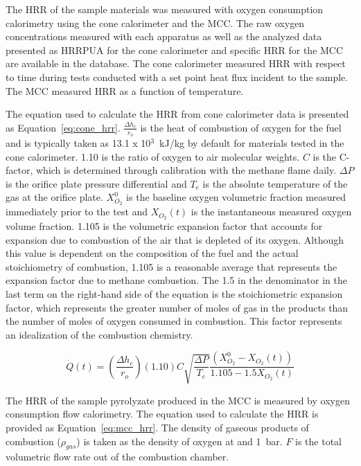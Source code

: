 \documentclass[12pt,oneside]{book}
\begin{document}
The HRR of the sample materials was measured with oxygen consumption calorimetry using the cone calorimeter and the MCC. The raw oxygen concentrations measured with each apparatus as well as the analyzed data presented as HRRPUA for the cone calorimeter and specific HRR for the MCC are available in the database. The cone calorimeter measured HRR with respect to time during tests conducted with a set point heat flux incident to the sample. The MCC measured HRR as a function of temperature.

The equation used to calculate the HRR from cone calorimeter data is presented as Equation~\ref{eq:cone_hrr}. $\frac{\Delta{h_c}}{r_o}$ is the heat of combustion of oxygen for the fuel and is typically taken as 13.1 x 10$^3$~kJ/kg by default for materials tested in the cone calorimeter. 1.10 is the ratio of oxygen to air molecular weights. $C$ is the C-factor, which is determined through calibration with the methane flame daily. $\Delta{P}$ is the orifice plate pressure differential and $T_e$ is the absolute temperature of the gas at the orifice plate. $X_{O_2}^0$ is the baseline oxygen volumetric fraction measured immediately prior to the test and $X_{O_2}(t)$ is the instantaneous measured oxygen volume fraction. 1.105 is the volumetric expansion factor that accounts for expansion due to combustion of the air that is depleted of its oxygen. Although this value is dependent on the composition of the fuel and the actual stoichiometry of combustion, 1.105 is a reasonable average that represents the expansion factor due to methane combustion. The 1.5 in the denominator in the last term on the right-hand side of the equation is the stoichiometric expansion factor, which represents the greater number of moles of gas in the products than the number of moles of oxygen consumed in combustion. This factor represents an idealization of the combustion chemistry.

\begin{equation}
\dot{Q}(t) = \left(\frac{\Delta{h_c}}{r_o}\right)(1.10)C\sqrt{\frac{\Delta{P}}{T_e}}\frac{(X_{O_2}^0-X_{O_2}(t))}{1.105-1.5X_{O_2}(t)}  \label{eq:cone_hrr}
\end{equation}

The HRR of the sample pyrolyzate produced in the MCC is measured by oxygen consumption flow calorimetry. The equation used to calculate the HRR is provided as Equation~\ref{eq:mcc_hrr}. The density of gaseous products of combustion ($\rho_{gas}$) is taken as the density of oxygen at  and 1~bar. $F$ is the total volumetric flow rate out of the combustion chamber.
\end{document}
